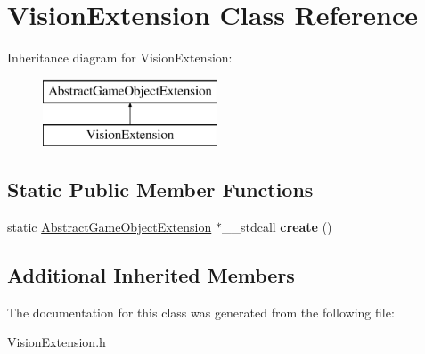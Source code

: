 \hypertarget{class_vision_extension}{}\section{Vision\+Extension Class Reference}
\label{class_vision_extension}
Inheritance diagram for Vision\+Extension\+:\begin{figure}[H]
\begin{center}
\leavevmode
\includegraphics[height=2.000000cm]{class_vision_extension}
\end{center}
\end{figure}
\subsection*{Static Public Member Functions}
\begin{DoxyCompactItemize}
\item 
\mbox{\label{class_vision_extension_a56320099331767b9f62a3ccbac4aba06}} 
static \mbox{\hyperlink{class_abstract_game_object_extension}{Abstract\+Game\+Object\+Extension}} $\ast$\+\_\+\+\_\+stdcall {\bfseries create} ()
\end{DoxyCompactItemize}
\subsection*{Additional Inherited Members}


The documentation for this class was generated from the following file\+:\begin{DoxyCompactItemize}
\item 
Vision\+Extension.\+h\end{DoxyCompactItemize}
